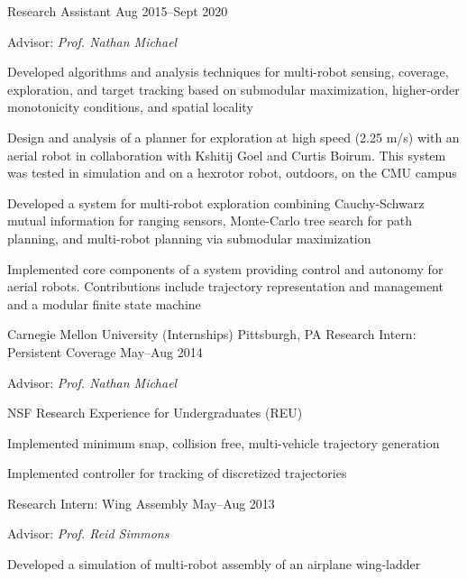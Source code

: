 \begin{cventries}
  {Research Assistant}
  {Aug 2015--Sept 2020}
  {
    Advisor: \emph{Prof. Nathan Michael}\linebreak
    \begin{cvitems} %
    \item Developed algorithms and analysis techniques for multi-robot sensing,
      coverage, exploration, and target tracking based on submodular
      maximization, higher-order monotonicity conditions, and spatial locality
    \item Design and analysis of a planner for exploration at high speed (2.25
      m/s) with an aerial robot in collaboration with Kshitij Goel and Curtis
      Boirum.
      This system was tested in simulation and on a hexrotor robot, outdoors, on
      the CMU campus
    \item Developed a system for multi-robot exploration combining Cauchy-Schwarz
      mutual information for ranging sensors, Monte-Carlo tree search for path
      planning, and multi-robot planning via submodular maximization
    \item Implemented core components of a system providing control and autonomy
      for aerial robots.
      Contributions include trajectory representation and management and a
      modular finite state machine
    \end{cvitems}
  }
  \cventrytwo
  {Carnegie Mellon University (Internships)}
  {Pittsburgh, PA}
  {Research Intern: Persistent Coverage}
  {May--Aug 2014}
  {
    Advisor: \emph{Prof. Nathan Michael}\linebreak
    \begin{cvitems}
    \item NSF Research Experience for Undergraduates (REU)
    \item Implemented minimum snap, collision free, multi-vehicle trajectory
      generation
    \item Implemented controller for tracking of discretized trajectories
    \end{cvitems}
  }
  {Research Intern: Wing Assembly}
  {May--Aug 2013}
  {
    Advisor: \emph{Prof. Reid Simmons}\linebreak
    \begin{cvitems}
    \item Developed a simulation of multi-robot assembly of an airplane wing-ladder

\end{cvitems}}
\end{cventries}
